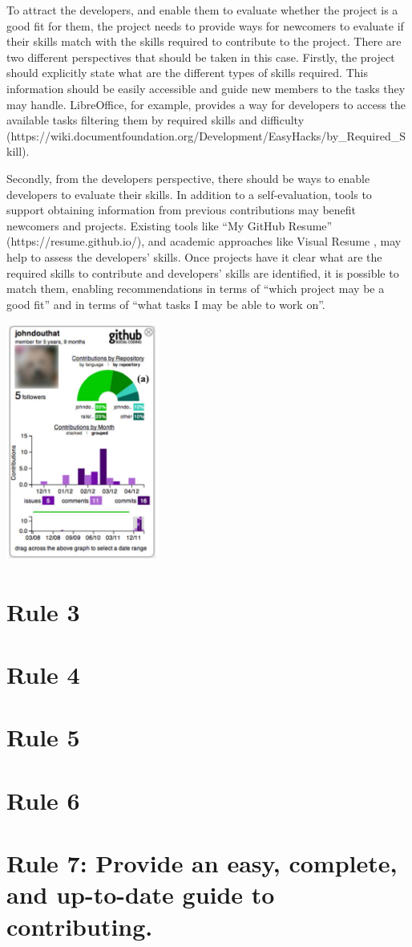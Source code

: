 \documentclass[10pt,letterpaper]{article}
\newcommand{\rulemajor}[1]{\section{#1}}
\begin{document}
To attract the developers,
and enable them to evaluate whether the project is a good fit for them,
the project needs to provide ways for newcomers to evaluate if their skills match with the skills required to contribute to the project.
There are two different perspectives that should be taken in this case.
Firstly,
the project should explicitly state what are the different types of skills required.
This information should be easily accessible and guide new members to the tasks they may handle.
LibreOffice,
for example,
provides a way for developers to access the available tasks filtering them by required skills and difficulty
(https://wiki.documentfoundation.org/Development/EasyHacks/by\_Required\_Skill).

Secondly,
from the developers perspective,
there should be ways to enable developers to evaluate their skills.
In addition to a self-evaluation,
tools to support obtaining information from previous contributions may benefit newcomers and projects.
Existing tools like ``My GitHub Resume'' (https://resume.github.io/),
and academic approaches like Visual Resume \cite{b:sarma},
may help to assess the developers' skills.
Once projects have it clear what are the required skills to contribute and developers' skills are identified,
it is possible to match them,
enabling recommendations in terms of ``which project may be a good fit''
and in terms of ``what tasks I may be able to work on''.

\includegraphics[width=5.0cm]{contributions.png}

\rulemajor{Rule 3}

\rulemajor{Rule 4}

\rulemajor{Rule 5}

\rulemajor{Rule 6}

\rulemajor{Rule 7: Provide an easy, complete, and up-to-date guide to contributing.}
\end{document}
